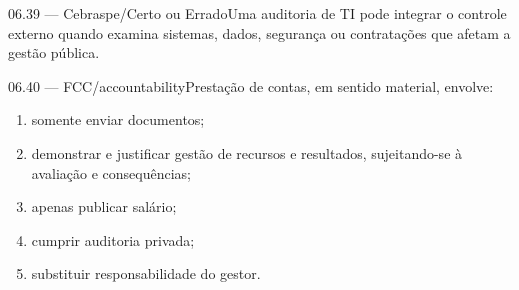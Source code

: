 \begin{questao}{ 06.39 — Cebraspe/Certo ou Errado}Uma auditoria de TI pode integrar o controle externo quando examina sistemas, dados, segurança ou contratações que afetam a gestão pública.\end{questao}
\begin{questao}{ 06.40 — FCC/accountability}Prestação de contas, em sentido material, envolve:\begin{enumerate}[label=\Alph*)]\item somente enviar documentos;\item demonstrar e justificar gestão de recursos e resultados, sujeitando-se à avaliação e consequências;\item apenas publicar salário;\item cumprir auditoria privada;\item substituir responsabilidade do gestor.\end{enumerate}\end{questao}

